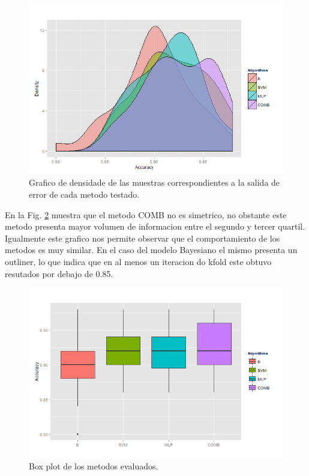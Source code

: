\documentclass[12pt]{article}
\begin{document}
\begin{figure}[h]
\centering
\includegraphics[width=4.5in]{../out/density-graph.png}
\caption{Grafico de densidade de las muestras correspondientes a la salida de error de cada metodo testado.}
\label{fig:densidade_acc}
\end{figure} 

En la Fig. \ref{fig:boxplot_acc} muestra que el metodo COMB no es simetrico, no obstante este metodo presenta mayor volumen de informacion entre el segundo y tercer quartil. Igualmente este grafico nos permite observar que el comportamiento de los metodos es muy similar. En el caso del modelo Bayesiano el mismo presenta un outliner, lo que indica que en al menos un iteracion do kfold este obtuvo resutados por debajo de 0.85. 

\begin{figure}[!h]
\centering
\includegraphics[width=4.5in]{../out/boxplot-errors.png}
\caption{Box plot de los metodos evaluados.}
\label{fig:boxplot_acc}
\end{figure}  


\end{document}
